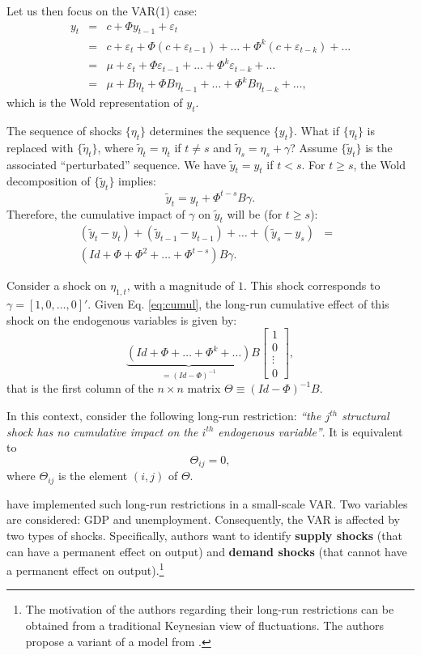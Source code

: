 \documentclass[
  11pt,
]{book}
\theoremstyle{definition}
\theoremstyle{definition}
\theoremstyle{definition}
\theoremstyle{definition}
\theoremstyle{remark}
\begin{document}
Let us then focus on the VAR(1) case:
\begin{eqnarray*}
y_{t} &=& c+\Phi y_{t-1}+\varepsilon_{t}\\
& = & c+\varepsilon_{t}+\Phi(c+\varepsilon_{t-1})+\ldots+\Phi^{k}(c+\varepsilon_{t-k})+\ldots \\
& = & \mu +\varepsilon_{t}+\Phi\varepsilon_{t-1}+\ldots+\Phi^{k}\varepsilon_{t-k}+\ldots \\
& = & \mu +B\eta_{t}+\Phi B\eta_{t-1}+\ldots+\Phi^{k}B\eta_{t-k}+\ldots,
\end{eqnarray*}
which is the Wold representation of \(y_t\).

The sequence of shocks \(\{\eta_t\}\) determines the sequence \(\{y_t\}\). What if \(\{\eta_t\}\) is replaced with \(\{\tilde{\eta}_t\}\), where \(\tilde{\eta}_t=\eta_t\) if \(t \ne s\) and \(\tilde{\eta}_s=\eta_s + \gamma\)? Assume \(\{\tilde{y}_t\}\) is the associated ``perturbated'' sequence. We have \(\tilde{y}_t = y_t\) if \(t<s\). For \(t \ge s\), the Wold decomposition of \(\{\tilde{y}_t\}\) implies:
\[
\tilde{y}_t = y_t + \Phi^{t-s} B \gamma.
\]
Therefore, the cumulative impact of \(\gamma\) on \(\tilde{y}_t\) will be (for \(t \ge s\)):
\begin{eqnarray}
(\tilde{y}_t - y_t) +  (\tilde{y}_{t-1} - y_{t-1}) + \dots +  (\tilde{y}_s - y_s) &=& \nonumber \\
(Id + \Phi + \Phi^2 + \dots + \Phi^{t-s}) B \gamma.&& \label{eq:cumul}
\end{eqnarray}

Consider a shock on \(\eta_{1,t}\), with a magnitude of \(1\). This shock corresponds to \(\gamma = [1,0,\dots,0]'\). Given Eq. \eqref{eq:cumul}, the long-run cumulative effect of this shock on the endogenous variables is given by:
\[
\underbrace{(Id+\Phi+\ldots+\Phi^{k}+\ldots)}_{=(Id - \Phi)^{-1}}B\left[\begin{array}{c}
1\\
0\\
\vdots\\
0\end{array}\right],
\]
that is the first column of the \(n \times n\) matrix \(\Theta \equiv (Id - \Phi)^{-1}B\).

In this context, consider the following long-run restriction: \emph{``the \(j^{th}\) structural shock has no cumulative impact on the \(i^{th}\) endogenous variable''}. It is equivalent to
\[
\Theta_{ij}=0,
\]
where \(\Theta_{ij}\) is the element \((i,j)\) of \(\Theta\).

\citet{Blanchard_Quah_1989} have implemented such long-run restrictions in a small-scale VAR. Two variables are considered: GDP and unemployment. Consequently, the VAR is affected by two types of shocks. Specifically, authors want to identify \textbf{supply shocks} (that can have a permanent effect on output) and \textbf{demand shocks} (that cannot have a permanent effect on output).\footnote{The motivation of the authors regarding their long-run restrictions can be obtained from a traditional Keynesian view of fluctuations. The authors propose a variant of a model from \citet{Fischer_1977}.
}
\end{document}
